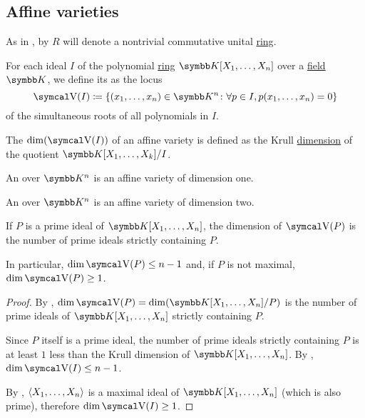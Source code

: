 \subsection{Affine varieties}\label{subsec:affine_varieties}

As in , by \( R \) will denote a nontrivial commutative unital \hyperref[def:semiring/commutative_unital_ring]{ring}.

\begin{definition}\label{def:affine_variety}
  For each ideal \( I \) of the polynomial \hyperref[def:multivariate_polynomial]{ring} \( \BK[X_1, \ldots, X_n] \) over a \hyperref[def:field]{field} \( \BK \), we define its  as the locus
  \begin{equation*}
    \CV(I) \coloneqq \{ (x_1, \ldots, x_n) \in \BK^n \colon \forall p \in I, p(x_1, \ldots, x_n) = 0 \}
  \end{equation*}
  of the simultaneous roots of all polynomials in \( I \).

  \begin{DefEnum}
     The  \( \dim(\CV(I)) \) of an affine variety is defined as the Krull \hyperref[def:krull_dimension]{dimension} of the quotient \( \BK[X_1, \ldots, X_k] / I \).

     An  over \( \BK^n \) is an affine variety of dimension one.

     An  over \( \BK^n \) is an affine variety of dimension two.
  \end{DefEnum}
\end{definition}

\begin{proposition}\label{thm:dimension_of_variety_of_prime_ideal}
  If \( P \) is a prime ideal of \( \BK[X_1, \ldots, X_n] \), the dimension of \( \CV(P) \) is the number of prime ideals strictly containing \( P \).

  In particular, \( \dim \CV(P) \leq n - 1 \) and, if \( P \) is not maximal, \( \dim \CV(P) \geq 1 \).
\end{proposition}
\begin{proof}
  By , \( \dim \CV(P) = \dim(\BK[X_1, \ldots, X_n] / P) \) is the number of prime ideals of \( \BK[X_1, \ldots, X_n] \) strictly containing \( P \).

  Since \( P \) itself is a prime ideal, the number of prime ideals strictly containing \( P \) is at least \( 1 \) less than the Krull dimension of \( \BK[X_1, \ldots, X_n] \). By , \( \dim \CV(I) \leq n - 1 \).

  By , \( \Braket{X_1, \ldots, X_n} \) is a maximal ideal of \( \BK[X_1, \ldots, X_n] \) (which is also prime), therefore \( \dim \CV(I) \geq 1 \).
\end{proof}

